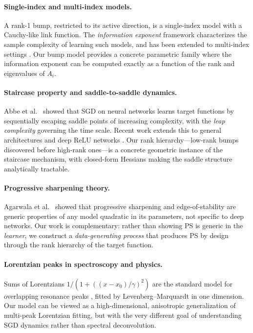 \documentclass{article}
\begin{document}
\paragraph{Single-index and multi-index models.}
A rank-1 bump, restricted to its active direction, is a single-index
model with a Cauchy-like link function. The \emph{information exponent}
framework \cite{bietti2022single,damian2023multiindex} characterizes the
sample complexity of learning such models, and has been extended to
multi-index settings
\cite{ren2024orthogonal,damian2025generativeleap,bruna2025survey}.
Our bump model provides a concrete parametric family where the
information exponent can be computed exactly as a function of the rank
and eigenvalues of $A_i$.

\paragraph{Staircase property and saddle-to-saddle dynamics.}
Abbe et al.\ \cite{abbe2021staircase,abbe2023leap} showed that SGD
on neural networks learns target functions by sequentially escaping
saddle points of increasing complexity, with the \emph{leap complexity}
governing the time scale. Recent work extends this to general
architectures \cite{zhang2025saddlesimplicity} and deep ReLU networks
\cite{bantzis2025deeprelu}. Our rank hierarchy---low-rank bumps
discovered before high-rank ones---is a concrete geometric instance of
the staircase mechanism, with closed-form Hessians making the saddle
structure analytically tractable.

\paragraph{Progressive sharpening theory.}
Agarwala et al.\ \cite{agarwala2023secondorder} showed that progressive
sharpening and edge-of-stability are generic properties of any model
quadratic in its parameters, not specific to deep networks. Our work is
complementary: rather than showing PS is generic in the \emph{learner},
we construct a \emph{data-generating process} that produces PS by
design through the rank hierarchy of the target function.

\paragraph{Lorentzian peaks in spectroscopy and physics.}
Sums of Lorentzians $1/(1 + ((x-x_0)/\gamma)^2)$ are the standard
model for overlapping resonance peaks \cite{breitwigner1936}, fitted by
Levenberg--Marquardt in one dimension. Our model can be viewed as a
high-dimensional, anisotropic generalization of multi-peak Lorentzian
fitting, but with the very different goal of understanding SGD dynamics
rather than spectral deconvolution.
\end{document}
